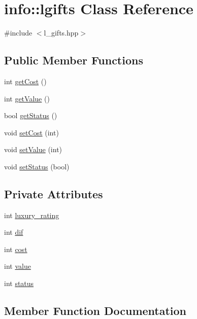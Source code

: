 \hypertarget{classinfo_1_1lgifts}{}\section{info\+:\+:lgifts Class Reference}
\label{classinfo_1_1lgifts}


{\ttfamily \#include $<$l\+\_\+gifts.\+hpp$>$}

\subsection*{Public Member Functions}
\begin{DoxyCompactItemize}
\item 
int \hyperlink{classinfo_1_1lgifts_a6a6999d8140331d28dafdd54a400e51c}{get\+Cost} ()
\item 
int \hyperlink{classinfo_1_1lgifts_aa3ba1bde30050bf30e7672e76142e617}{get\+Value} ()
\item 
bool \hyperlink{classinfo_1_1lgifts_ae5547d121a6a1f3cddb0e4c317f247ec}{get\+Status} ()
\item 
void \hyperlink{classinfo_1_1lgifts_a15086e5b37ba3be29007c34604ba8741}{set\+Cost} (int)
\item 
void \hyperlink{classinfo_1_1lgifts_a61d76c180f0d790cf338f2aa8df4456d}{set\+Value} (int)
\item 
void \hyperlink{classinfo_1_1lgifts_aaa1f052d9207ce2bbedcb76e74eb3599}{set\+Status} (bool)
\end{DoxyCompactItemize}
\subsection*{Private Attributes}
\begin{DoxyCompactItemize}
\item 
int \hyperlink{classinfo_1_1lgifts_af7d1f2646900dbffa6b1d309c75cbbfe}{luxury\+\_\+rating}
\item 
int \hyperlink{classinfo_1_1lgifts_afa4e9d3e04fabf36525bc4d54afd4ed3}{dif}
\item 
int \hyperlink{classinfo_1_1lgifts_a60bc0d116fd17a7e5f3295a1dda56154}{cost}
\item 
int \hyperlink{classinfo_1_1lgifts_afe747b4615f7c848299366541fb59193}{value}
\item 
int \hyperlink{classinfo_1_1lgifts_a6b79a48b121a35d5f6f33a461cd59a29}{status}
\end{DoxyCompactItemize}


\subsection{Member Function Documentation}
\mbox{\label{classinfo_1_1lgifts_a6a6999d8140331d28dafdd54a400e51c}} 

